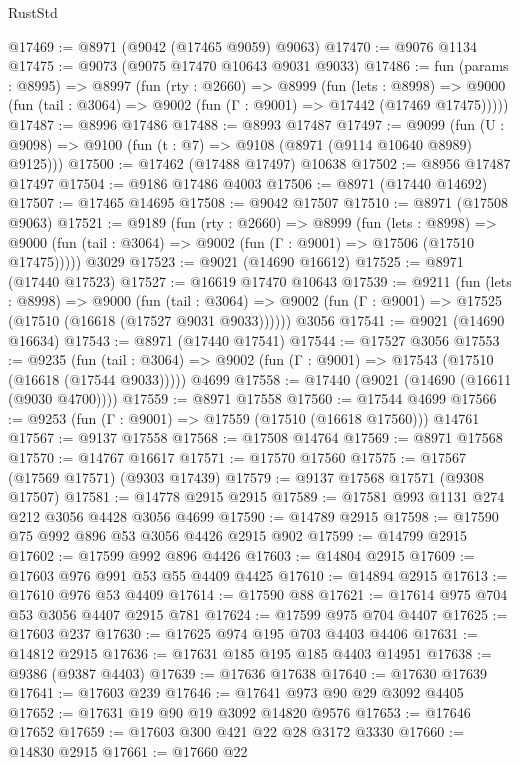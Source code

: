 \begin{lexlean}{RustStd}
\begin{coremodule}
@17469 := @8971 (@9042 (@17465 @9059) @9063)
@17470 := @9076 @1134
@17475 := @9073 (@9075 @17470 @10643 @9031 @9033)
@17486 := fun (params : @8995) =>
  @8997
    (fun (rty : @2660) =>
    @8999
      (fun (lets : @8998) =>
      @9000 (fun (tail : @3064) => @9002 (fun (Γ : @9001) => @17442 (@17469 @17475)))))
@17487 := @8996 @17486
@17488 := @8993 @17487
@17497 := @9099
    (fun (U : @9098) => @9100 (fun (t : @7) => @9108 (@8971 (@9114 @10640 @8989) @9125)))
@17500 := @17462 (@17488 @17497) @10638
@17502 := @8956 @17487 @17497
@17504 := @9186 @17486 @4003
@17506 := @8971 (@17440 @14692)
@17507 := @17465 @14695
@17508 := @9042 @17507
@17510 := @8971 (@17508 @9063)
@17521 := @9189
    (fun (rty : @2660) =>
    @8999
      (fun (lets : @8998) =>
      @9000 (fun (tail : @3064) => @9002 (fun (Γ : @9001) => @17506 (@17510 @17475)))))
    @3029
@17523 := @9021 (@14690 @16612)
@17525 := @8971 (@17440 @17523)
@17527 := @16619 @17470 @10643
@17539 := @9211
    (fun (lets : @8998) =>
    @9000
      (fun (tail : @3064) =>
      @9002 (fun (Γ : @9001) => @17525 (@17510 (@16618 (@17527 @9031 @9033))))))
    @3056
@17541 := @9021 (@14690 @16634)
@17543 := @8971 (@17440 @17541)
@17544 := @17527 @3056
@17553 := @9235
    (fun (tail : @3064) => @9002 (fun (Γ : @9001) => @17543 (@17510 (@16618 (@17544 @9033)))))
    @4699
@17558 := @17440 (@9021 (@14690 (@16611 (@9030 @4700))))
@17559 := @8971 @17558
@17560 := @17544 @4699
@17566 := @9253 (fun (Γ : @9001) => @17559 (@17510 (@16618 @17560))) @14761
@17567 := @9137 @17558
@17568 := @17508 @14764
@17569 := @8971 @17568
@17570 := @14767 @16617
@17571 := @17570 @17560
@17575 := @17567 (@17569 @17571) (@9303 @17439)
@17579 := @9137 @17568 @17571 (@9308 @17507)
@17581 := @14778 @2915 @2915
@17589 := @17581 @993 @1131 @274 @212 @3056 @4428 @3056 @4699
@17590 := @14789 @2915
@17598 := @17590 @75 @992 @896 @53 @3056 @4426 @2915 @902
@17599 := @14799 @2915
@17602 := @17599 @992 @896 @4426
@17603 := @14804 @2915
@17609 := @17603 @976 @991 @53 @55 @4409 @4425
@17610 := @14894 @2915
@17613 := @17610 @976 @53 @4409
@17614 := @17590 @88
@17621 := @17614 @975 @704 @53 @3056 @4407 @2915 @781
@17624 := @17599 @975 @704 @4407
@17625 := @17603 @237
@17630 := @17625 @974 @195 @703 @4403 @4406
@17631 := @14812 @2915
@17636 := @17631 @185 @195 @185 @4403 @14951
@17638 := @9386 (@9387 @4403)
@17639 := @17636 @17638
@17640 := @17630 @17639
@17641 := @17603 @239
@17646 := @17641 @973 @90 @29 @3092 @4405
@17652 := @17631 @19 @90 @19 @3092 @14820 @9576
@17653 := @17646 @17652
@17659 := @17603 @300 @421 @22 @28 @3172 @3330
@17660 := @14830 @2915
@17661 := @17660 @22

\end{coremodule}
\end{lexlean}
